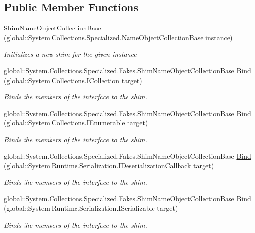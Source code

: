 \subsection*{Public Member Functions}
\begin{DoxyCompactItemize}
\item 
\hyperlink{class_system_1_1_collections_1_1_specialized_1_1_fakes_1_1_shim_name_object_collection_base_a68a1c3a2158a2ff78a0dea98274413db}{Shim\-Name\-Object\-Collection\-Base} (global\-::\-System.\-Collections.\-Specialized.\-Name\-Object\-Collection\-Base instance)
\begin{DoxyCompactList}\small\item\em Initializes a new shim for the given instance\end{DoxyCompactList}\item 
global\-::\-System.\-Collections.\-Specialized.\-Fakes.\-Shim\-Name\-Object\-Collection\-Base \hyperlink{class_system_1_1_collections_1_1_specialized_1_1_fakes_1_1_shim_name_object_collection_base_a4adf88f14bf420e4025981cb2dc2b33c}{Bind} (global\-::\-System.\-Collections.\-I\-Collection target)
\begin{DoxyCompactList}\small\item\em Binds the members of the interface to the shim.\end{DoxyCompactList}\item 
global\-::\-System.\-Collections.\-Specialized.\-Fakes.\-Shim\-Name\-Object\-Collection\-Base \hyperlink{class_system_1_1_collections_1_1_specialized_1_1_fakes_1_1_shim_name_object_collection_base_a1c808e6e3aaac3a417246df383027807}{Bind} (global\-::\-System.\-Collections.\-I\-Enumerable target)
\begin{DoxyCompactList}\small\item\em Binds the members of the interface to the shim.\end{DoxyCompactList}\item 
global\-::\-System.\-Collections.\-Specialized.\-Fakes.\-Shim\-Name\-Object\-Collection\-Base \hyperlink{class_system_1_1_collections_1_1_specialized_1_1_fakes_1_1_shim_name_object_collection_base_a7196da97f827413a75e7310309d1ebf5}{Bind} (global\-::\-System.\-Runtime.\-Serialization.\-I\-Deserialization\-Callback target)
\begin{DoxyCompactList}\small\item\em Binds the members of the interface to the shim.\end{DoxyCompactList}\item 
global\-::\-System.\-Collections.\-Specialized.\-Fakes.\-Shim\-Name\-Object\-Collection\-Base \hyperlink{class_system_1_1_collections_1_1_specialized_1_1_fakes_1_1_shim_name_object_collection_base_a5678bb19a536478ef3d513d8cc51118a}{Bind} (global\-::\-System.\-Runtime.\-Serialization.\-I\-Serializable target)
\begin{DoxyCompactList}\small\item\em Binds the members of the interface to the shim.\end{DoxyCompactList}\end{DoxyCompactItemize}
